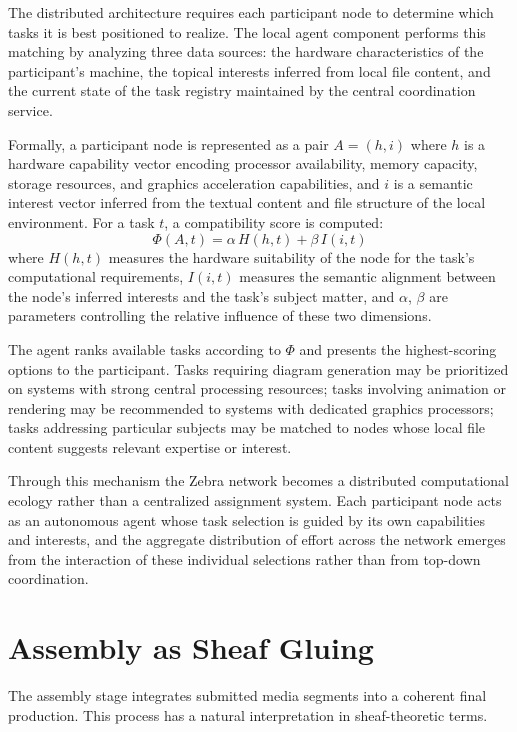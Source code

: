 \documentclass[12pt,a4paper]{article}
\begin{document}
The distributed architecture requires each participant node to determine which tasks it is best positioned to realize. The local agent component performs this matching by analyzing three data sources: the hardware characteristics of the participant's machine, the topical interests inferred from local file content, and the current state of the task registry maintained by the central coordination service.

Formally, a participant node is represented as a pair $A = (h, i)$ where $h$ is a hardware capability vector encoding processor availability, memory capacity, storage resources, and graphics acceleration capabilities, and $i$ is a semantic interest vector inferred from the textual content and file structure of the local environment. For a task $t$, a compatibility score is computed:
\[
\Phi(A, t) = \alpha \, H(h, t) + \beta \, I(i, t)
\]
where $H(h, t)$ measures the hardware suitability of the node for the task's computational requirements, $I(i, t)$ measures the semantic alignment between the node's inferred interests and the task's subject matter, and $\alpha$, $\beta$ are parameters controlling the relative influence of these two dimensions.

The agent ranks available tasks according to $\Phi$ and presents the highest-scoring options to the participant. Tasks requiring diagram generation may be prioritized on systems with strong central processing resources; tasks involving animation or rendering may be recommended to systems with dedicated graphics processors; tasks addressing particular subjects may be matched to nodes whose local file content suggests relevant expertise or interest.

Through this mechanism the Zebra network becomes a distributed computational ecology rather than a centralized assignment system. Each participant node acts as an autonomous agent whose task selection is guided by its own capabilities and interests, and the aggregate distribution of effort across the network emerges from the interaction of these individual selections rather than from top-down coordination.

\section{Assembly as Sheaf Gluing}

The assembly stage integrates submitted media segments into a coherent final production. This process has a natural interpretation in sheaf-theoretic terms.
\end{document}
